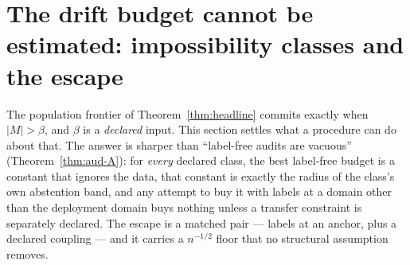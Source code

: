 %
%
%
%

\providecommand{\E}{\mathbb{E}}
\providecommand{\Law}{\mathcal{L}}
\providecommand{\sign}{\operatorname{sign}}
\providecommand{\TV}{\mathrm{TV}}
\providecommand{\KL}{\mathrm{KL}}

\section{The drift budget cannot be estimated: impossibility classes and the escape}
\label{app:beta-impossible}

The population frontier of Theorem~\ref{thm:headline} commits exactly when $|M|>\beta$, and
$\beta$ is a \emph{declared} input. This section settles what a procedure can do about that.
The answer is sharper than ``label-free audits are vacuous''
(Theorem~\ref{thm:aud-A}): for \emph{every} declared class, the best label-free budget is a
constant that ignores the data, that constant is exactly the radius of the class's own
abstention band, and any attempt to buy it with labels at a domain other than the deployment
domain buys nothing unless a transfer constraint is separately declared. The escape is a
matched pair --- labels at an anchor, plus a declared coupling --- and it carries a
$n^{-1/2}$ floor that no structural assumption removes.

